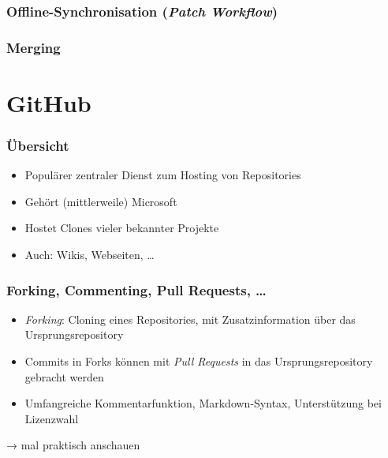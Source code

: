 \documentclass{cms-kurs}
\begin{document}
\begin{frame}
  \frametitle{Offline-Synchronisation (\emph{Patch Workflow})}

  \onslide<+->


\end{frame}

\begin{frame}
  \frametitle{Merging}

  \onslide<+->


\end{frame}

\section{GitHub}

\begin{frame}
  \frametitle{Übersicht}

  \onslide<+->

  \begin{itemize}
  \item Populärer zentraler Dienst zum Hosting von Repositories
  \item Gehört (mittlerweile) Microsoft
  \item Hostet Clones vieler bekannter Projekte
  \item Auch: Wikis, Webseiten, …
  \end{itemize}

\end{frame}

\begin{frame}
  \frametitle{Forking, Commenting, Pull Requests, …}

  \onslide<+->

  \begin{itemize}
  \item \emph{Forking}: Cloning eines Repositories, mit Zusatzinformation über
    das Ursprungsrepository
  \item Commits in Forks können mit \emph{Pull Requests} in das
    Ursprungsrepository gebracht werden
  \item Umfangreiche Kommentarfunktion, Markdown-Syntax, Unterstützung bei
    Lizenzwahl
  \end{itemize}

  \medskip{}

  → mal praktisch anschauen

\end{frame}
\end{document}
